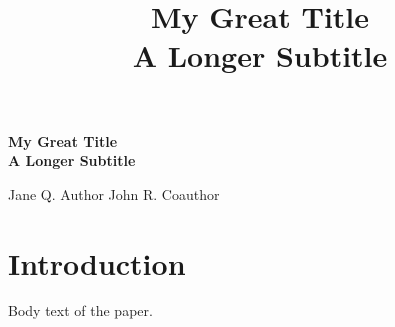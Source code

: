 \documentclass{article}
\title{My Great Title \\[2pt] A Longer Subtitle}
\begin{document}
\begin{center}
{\LARGE\bfseries My Great Title \\[3pt] A Longer Subtitle\par}
\vspace{6pt}
{\large Jane Q. Author \quad John R. Coauthor\par}
\end{center}
\section{Introduction}
Body text of the paper.
\end{document}
